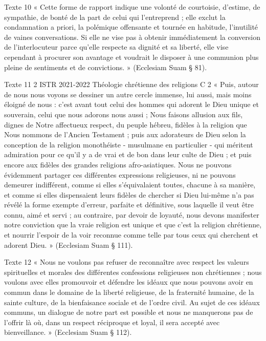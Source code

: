 Texte  10 «  Cette  forme  de  rapport  indique  une  volonté  de  courtoisie,  d'estime,  de  sympathie,  de  bonté de  la  part  de  celui  qui  l'entreprend  ;  elle  exclut  la  condamnation  a  priori,  la  polémique offensante  et  tournée  en  habitude,  l'inutilité  de  vaines  conversations.  Si  elle  ne  vise  pas  à obtenir  immédiatement  la  conversion  de  l'interlocuteur  parce  qu'elle  respecte  sa  dignité  et  sa liberté,  elle  vise  cependant  à  procurer  son  avantage  et  voudrait  le  disposer  à  une  communion plus  pleine  de  sentiments  et  de  convictions.  »  (Ecclesiam  Suam  § 81). 


Texte  11 2   ISTR  2021-2022  Théologie  chrétienne  des  religions  C  2 «  Puis,  autour  de  nous  nous  voyons  se  dessiner  un  autre  cercle  immense,  lui  aussi,  mais  moins éloigné  de  nous  :  c'est  avant  tout  celui  des  hommes  qui  adorent  le  Dieu  unique  et  souverain, celui  que  nous  adorons  nous  aussi  ;  Nous  faisons  allusion  aux  fils,  dignes  de  Notre  affectueux respect,  du  peuple  hébreu,  fidèles  à  la  religion  que  Nous  nommons  de  l'Ancien  Testament  ; puis  aux  adorateurs  de  Dieu  selon  la  conception  de  la  religion  monothéiste  -  musulmane  en particulier  -  qui  méritent  admiration  pour  ce  qu'il  y  a  de  vrai  et  de  bon  dans  leur  culte  de  Dieu ; et  puis  encore  aux  fidèles  des  grandes  religions  afro-asiatiques.  Nous  ne  pouvons évidemment  partager  ces  différentes  expressions  religieuses,  ni  ne  pouvons  demeurer indifférent,  comme  si  elles  s'équivalaient  toutes,  chacune  à  sa  manière,  et  comme  si  elles dispensaient  leurs  fidèles  de  chercher  si  Dieu  lui-même  n'a  pas  révélé  la  forme  exempte d'erreur,  parfaite  et  définitive,  sous  laquelle  il  veut  être  connu,  aimé  et  servi  ;  au  contraire,  par devoir  de  loyauté,  nous  devons  manifester  notre  conviction  que  la  vraie  religion  est  unique  et que  c'est  la  religion  chrétienne,  et  nourrir  l'espoir  de  la  voir  reconnue  comme  telle  par  tous ceux qui  cherchent  et  adorent  Dieu.  »  (Ecclesiam  Suam  § 111). 


Texte  12 «  Nous  ne  voulons  pas  refuser  de  reconnaître  avec  respect  les  valeurs  spirituelles  et  morales des  différentes  confessions  religieuses  non  chrétiennes  ;  nous  voulons  avec  elles  promouvoir et  défendre  les  idéaux  que  nous  pouvons  avoir  en  commun  dans  le  domaine  de  la  liberté religieuse,  de  la  fraternité  humaine,  de  la  sainte  culture,  de  la  bienfaisance  sociale  et  de  l'ordre civil.  Au  sujet  de  ces  idéaux  communs,  un  dialogue  de  notre  part  est  possible  et  nous  ne manquerons  pas  de  l'offrir  là  où,  dans  un  respect  réciproque  et  loyal,  il  sera  accepté  avec bienveillance.  »  (Ecclesiam  Suam  § 112). 


